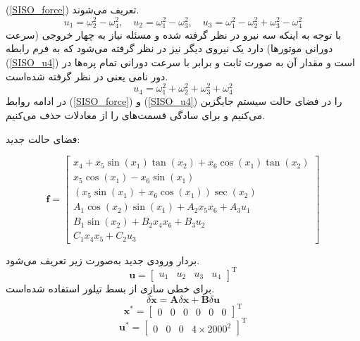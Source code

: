 (\ref{SISO_force})
تعریف می‌شوند.
\begin{equation}\label{SISO_force}
	u_1 = \omega_2^2 - \omega_4^2, \quad
	u_2 = \omega_1^2 - \omega_3^2, \quad
	u_3 = \omega_1^2 - \omega_2^2  + \omega_3^2 - \omega_4^2
\end{equation}
با توجه به اینکه سه نیرو در نظر گرفته ‌شده و مسئله نیاز به چهار خروجی (سرعت دورانی موتورها) دارد یک نیروی دیگر نیز در نظر گرفته ‌می‌شود که به فرم رابطه 
(\ref{SISO_u4})
است و مقدار آن به صورت ثابت و برابر با سرعت دورانی تمام پره‌ها در دور نامی یعنی
در نظر گرفته ‌شده‌‌است.
\begin{equation}\label{SISO_u4}
	u_4 = \omega_1^2 + \omega_2^2  + \omega_3^2 + \omega_4^2
\end{equation}
در ادامه روابط 
(\ref{SISO_force})
و
(\ref{SISO_u4})
را در فضای حالت سیستم جایگزین می‌کنیم و برای سادگی قسمت‌های 
را از معادلات حذف می‌کنیم.

فضای حالت جدید:

\begin{equation}
	\boldsymbol f = \begin{bmatrix}
		x_4 + x_5\sin(x_1)\tan(x_2) + x_6\cos(x_1)\tan(x_2)\\
		x_5\cos(x_1)- x_6\sin(x_1)\\
		(x_5\sin(x_1) + x_6\cos(x_1))\sec(x_2)\\
		A_1\cos(x_2)\sin(x_1) + 
		A_2x_5x_6 + A_3u_1
		\\
		B_1\sin(x_2) + 
		B_2x_4x_6 + B_3u_2\\
		C_1x_4x_5 + 
		C_2u_3
	\end{bmatrix}
\end{equation} 

بردار ورودی جدید به‌صورت زیر تعریف می‌شود.
\begin{equation}
	\boldsymbol{u} = \begin{bmatrix}
		u_1&u_2&u_3&u_4
	\end{bmatrix}^\mathrm{T}
\end{equation}
برای خطی سازی از بسط تیلور استفاده شده‌است.
\begin{equation}
	\delta \dot{\boldsymbol{x}} = \boldsymbol{A}\delta \boldsymbol x + \boldsymbol{B}\delta \boldsymbol u 
\end{equation}
\begin{equation}
	\boldsymbol{x^*} = \begin{bmatrix} %
		0& 0 & 0 & 0& 0& 0
	\end{bmatrix}^\mathrm{T}
\end{equation}
\begin{equation}
	\boldsymbol{u^*} = \begin{bmatrix}
		0&0&0&4\times2000^2
	\end{bmatrix}^\mathrm{T}
\end{equation}

